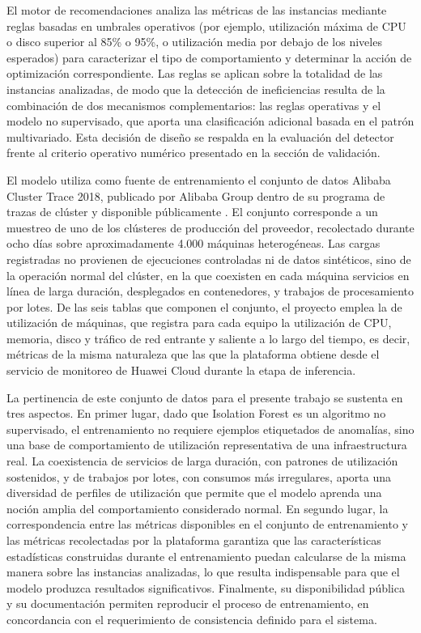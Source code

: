 El motor de recomendaciones analiza las métricas de las instancias mediante
reglas basadas en umbrales operativos (por ejemplo, utilización máxima de
CPU o disco superior al 85\% o 95\%, o utilización media por debajo de los
niveles esperados) para caracterizar el tipo de comportamiento y determinar
la acción de optimización correspondiente. Las reglas se aplican sobre la
totalidad de las instancias analizadas, de modo que la detección de
ineficiencias resulta de la combinación de dos mecanismos complementarios:
las reglas operativas y el modelo no supervisado, que aporta una
clasificación adicional basada en el patrón multivariado. Esta decisión
de diseño se respalda en la evaluación del detector frente al criterio
operativo numérico presentado en la sección de validación.

El modelo utiliza como fuente de entrenamiento el conjunto de datos
Alibaba Cluster Trace 2018, publicado por Alibaba Group dentro de su
programa de trazas de clúster y disponible públicamente
\parencite{AlibabaClusterTrace2018}. El conjunto corresponde a un
muestreo de uno de los clústeres de producción del proveedor, recolectado
durante ocho días sobre aproximadamente 4.000 máquinas heterogéneas. Las
cargas registradas no provienen de ejecuciones controladas ni de datos
sintéticos, sino de la operación normal del clúster, en la que coexisten
en cada máquina servicios en línea de larga duración, desplegados en
contenedores, y trabajos de procesamiento por lotes. De las seis tablas
que componen el conjunto, el proyecto emplea la de utilización de
máquinas, que registra para cada equipo la utilización de CPU, memoria,
disco y tráfico de red entrante y saliente a lo largo del tiempo, es
decir, métricas de la misma naturaleza que las que la plataforma obtiene
desde el servicio de monitoreo de Huawei Cloud durante la etapa de
inferencia.

La pertinencia de este conjunto de datos para el presente trabajo se
sustenta en tres aspectos. En primer lugar, dado que Isolation Forest es
un algoritmo no supervisado, el entrenamiento no requiere ejemplos
etiquetados de anomalías, sino una base de comportamiento de utilización
representativa de una infraestructura real. La coexistencia de servicios
de larga duración, con patrones de utilización sostenidos, y de trabajos
por lotes, con consumos más irregulares, aporta una diversidad de
perfiles de utilización que permite que el modelo aprenda una noción
amplia del comportamiento considerado normal. En segundo lugar, la
correspondencia entre las métricas disponibles en el conjunto de
entrenamiento y las métricas recolectadas por la plataforma garantiza
que las características estadísticas construidas durante el entrenamiento
puedan calcularse de la misma manera sobre las instancias analizadas, lo
que resulta indispensable para que el modelo produzca resultados
significativos. Finalmente, su disponibilidad pública y su documentación
permiten reproducir el proceso de entrenamiento, en concordancia con el
requerimiento de consistencia definido para el sistema.


